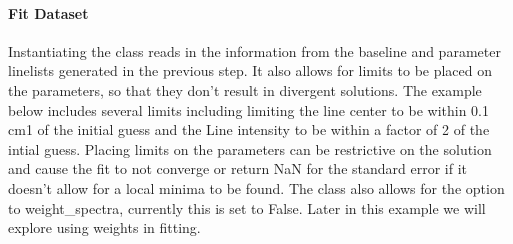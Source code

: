 \documentclass[letterpaper,10pt,english]{sphinxmanual}
\begin{document}
\paragraph{Fit Dataset}
\label{\detokenize{Fitting Experimental Spectra:fit-dataset}}
\sphinxAtStartPar
Instantiating the {\hyperref[\detokenize{MATS:MATS.fit_dataset.Fit_DataSet}]{}} class reads in the information from the baseline and parameter linelists generated in the previous step. It also allows for limits to be placed on the parameters, so that they don’t result in divergent solutions. The example below includes several limits including limiting the line center to be within 0.1 cm\sphinxhyphen{}1 of the initial guess and the Line intensity to be within a factor of 2 of the intial guess. Placing limits on the parameters can be restrictive on the solution and cause the fit to not converge or return NaN for the standard error if it doesn’t allow for a local minima to be found.  The {\hyperref[\detokenize{MATS:MATS.fit_dataset.Fit_DataSet}]{}} class also allows for the option to weight\_spectra, currently this is set to False. Later in this example we will explore using weights in fitting.
\end{document}
